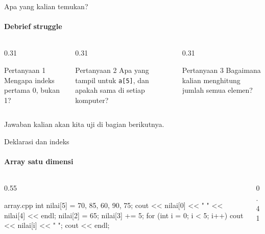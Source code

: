 \documentclass[t]{beamer}
\begin{document}
\begin{frame}{Apa yang kalian temukan?}
\framesubtitle{Debrief struggle}
\begin{columns}[T]
\begin{column}{0.31\textwidth}
\begin{BlokGelap}{Pertanyaan 1}
Mengapa indeks pertama 0, bukan 1?
\end{BlokGelap}
\end{column}
\begin{column}{0.31\textwidth}
\begin{BlokGelap}{Pertanyaan 2}
Apa yang tampil untuk \texttt{a[5]}, dan apakah sama di setiap komputer?
\end{BlokGelap}
\end{column}
\begin{column}{0.31\textwidth}
\begin{BlokGelap}{Pertanyaan 3}
Bagaimana kalian menghitung jumlah semua elemen?
\end{BlokGelap}
\end{column}
\end{columns}
\vspace{10pt}
Jawaban kalian akan kita uji di bagian berikutnya.
\end{frame}


\begin{frame}[fragile]{Deklarasi dan indeks}
\framesubtitle{Array satu dimensi}
\begin{columns}[T]
\begin{column}{0.55\textwidth}
\begin{Kode}[]{array.cpp}
int nilai[5] = {70, 85, 60, 90, 75};
cout << nilai[0] << " " << nilai[4] << endl;
nilai[2] = 65;
nilai[3] += 5;
for (int i = 0; i < 5; i++) {
    cout << nilai[i] << " ";
}
cout << endl;
\end{Kode}
\end{column}
\begin{column}{0.41\textwidth}
\end{column}
\end{columns}
\end{frame}
\end{document}
